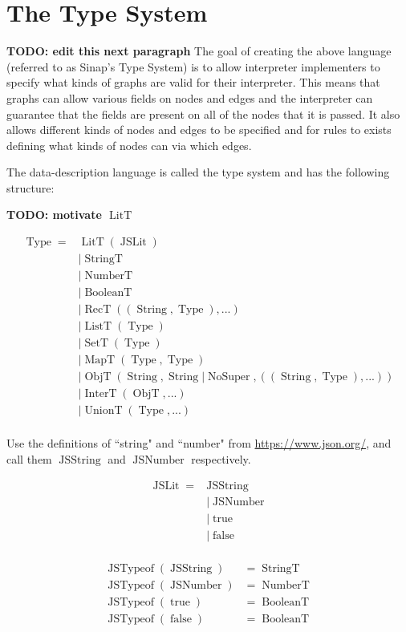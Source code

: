 \documentclass{article}
\DeclareMathOperator{\StringT}{StringT}
\DeclareMathOperator{\NumberT}{NumberT}
\DeclareMathOperator{\BooleanT}{BooleanT}
\DeclareMathOperator{\LitT}{LitT}
\DeclareMathOperator{\JSLit}{JSLit}
\DeclareMathOperator{\JSTypeof}{JSTypeof}
\DeclareMathOperator{\RecT}{RecT}
\DeclareMathOperator{\ObjT}{ObjT}
\DeclareMathOperator{\ListT}{ListT}
\DeclareMathOperator{\SetT}{SetT}
\DeclareMathOperator{\MapT}{MapT}
\DeclareMathOperator{\UnionT}{UnionT}
\DeclareMathOperator{\InterT}{InterT}
\DeclareMathOperator{\String}{String}
\DeclareMathOperator{\Type}{Type}
\DeclareMathOperator{\NoSuper}{NoSuper}
\begin{document}
\section{The Type System}

\textbf{TODO: edit this next paragraph}
The goal of creating the above language (referred to as Sinap's 
Type System) is to allow interpreter implementers to specify what 
kinds of graphs are valid for their interpreter. This means that 
graphs can allow various fields on nodes and edges and the interpreter
can guarantee that the fields are present on all of the nodes that it
is passed. It also allows different kinds of nodes and edges to be 
specified and for rules to exists defining what kinds of nodes can 
via which edges. 


The data-description language is called the type system and has 
the following structure:

\textbf{TODO: motivate \(\LitT\)}

\begin{align*}
\Type = &\LitT(\JSLit) \\
&|\StringT \\
&|\NumberT \\
&|\BooleanT \\
&|\RecT((\String, \Type), ...) \\
&|\ListT(\Type) \\
&|\SetT(\Type) \\
&|\MapT(\Type, \Type) \\
&|\ObjT(\String, \String | \NoSuper, ((\String, \Type), ...)) \\
&|\InterT(\ObjT, ...) \\
&|\UnionT(\Type, ...)\\
\end{align*}

Use the definitions of ``string" and ``number" from
\href{https://www.json.org/}{https://www.json.org/}, 
and call them \(\operatorname{JSString}\) and 
\(\operatorname{JSNumber}\) respectively.

\begin{align*}
    \JSLit = &\operatorname{JSString} \\
    &| \operatorname{JSNumber} \\
    &| \operatorname{true} \\
    &| \operatorname{false} \\
\end{align*}

\begin{align*}
    \JSTypeof(\operatorname{JSString}) &= \StringT \\
    \JSTypeof(\operatorname{JSNumber}) &= \NumberT \\
    \JSTypeof(\operatorname{true}) &= \BooleanT \\
    \JSTypeof(\operatorname{false}) &= \BooleanT \\
\end{align*}
\end{document}
